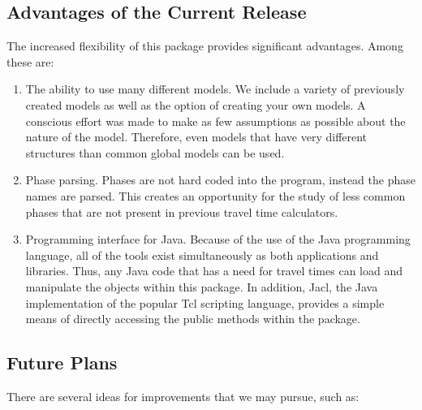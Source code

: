 \subsection{Advantages of the Current Release}
The increased flexibility of this package provides significant advantages. Among
these are:
\begin{enumerate}
\item The ability to use many different models. We include a variety of previously created
models as well as the option of creating your own models. A conscious effort 
was made to make as few assumptions as possible about the nature of the model. 
Therefore,
even models that have very different structures than common global models can be
used.

\item Phase parsing. Phases are not hard coded into the program, instead the phase
names are parsed. This creates an opportunity for the study of less common
phases that are not present in previous travel time calculators. 

\item Programming interface for Java. Because of the use of the Java programming
language, all of the tools exist simultaneously as both applications and libraries.
Thus, any Java code that has a need for travel times can load and manipulate
the objects within this package. In addition, Jacl, the Java implementation of the popular Tcl scripting language, provides a simple means of directly accessing the public methods within the package.

\end{enumerate}

 
\subsection{Future Plans}

There are several ideas for improvements that we may pursue, such as:


